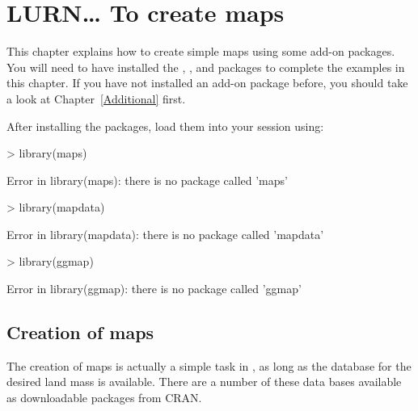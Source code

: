 

\chapter{LURN\ldots{} To create maps} 
\label{Maps} 
 



 
This chapter explains how to create simple maps using some add-on packages. You will need to have installed the , , and   packages to complete the examples in this chapter. If you have not installed an add-on package before, you should take a look at Chapter~\ref{Additional} first. 
 
After installing the packages, load them into your \R{} session using: 

\begin{Schunk}
\begin{Sinput}
> library(maps) 
\end{Sinput}
\begin{Soutput}
Error in library(maps): there is no package called 'maps'
\end{Soutput}
\begin{Sinput}
> library(mapdata) 
\end{Sinput}
\begin{Soutput}
Error in library(mapdata): there is no package called 'mapdata'
\end{Soutput}
\begin{Sinput}
> library(ggmap) 
\end{Sinput}
\begin{Soutput}
Error in library(ggmap): there is no package called 'ggmap'
\end{Soutput}
\end{Schunk}

 
\section{Creation of maps} 
 
The creation of maps is actually a simple task in \R{}, as long as the database for the desired land mass is available. There are a number of these data bases available as downloadable packages from CRAN. 
 
